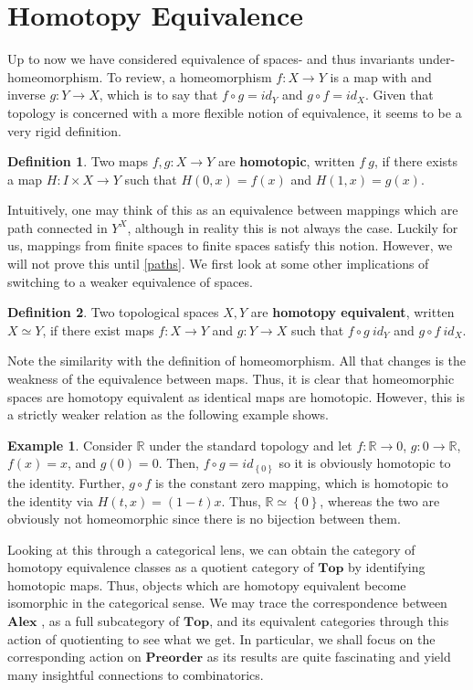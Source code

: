 \documentclass[paper=a4, fontsize=11pt]{scrartcl} %
\numberwithin{equation}{section} %
\numberwithin{figure}{section} %
\numberwithin{table}{section} %
\theoremstyle{definition}
\newtheorem{definition}{Definition}[section]
\newtheorem{example}{Example}[section]
\theoremstyle{remark}
\newcommand{\cat}[1]{\ensuremath{\mathbf{#1}} }
\newcommand{\Pre}{\cat{Preorder}}
\newcommand{\Al}{\cat{Alex}}
\newcommand{\comp}[2]{#1 \circ #2}
\newcommand{\Top}{\cat{Top}}
\newcommand{\homot}{\simeq}
\newcommand{\R}{\mathbb{R}}
\begin{document}
\section{Homotopy Equivalence}
Up to now we have considered equivalence of spaces- and thus invariants under- homeomorphism.
To review, a homeomorphism $f:X\rightarrow Y$ is a map with and inverse $g:Y\rightarrow X$, which is to say that $\comp{f}{g}=id_Y$ and $\comp{g}{f}=id_X$.
Given that topology is concerned with a more flexible notion of equivalence, it seems to be a very rigid definition. 
\begin{definition}
  Two maps $f,g:X\rightarrow Y$ are \textbf{homotopic}, written $f~g$, if there exists a map $H:I\times X\rightarrow Y$ such that $H(0,x)=f(x)$ and $H(1,x)=g(x)$.
\end{definition}
Intuitively, one may think of this as an equivalence between mappings which are path connected in $Y^X$, although in reality this is not always the case.
Luckily for us, mappings from finite spaces to finite spaces satisfy this notion.
However, we will not prove this until \ref{paths}.
We first look at some other implications of switching to a weaker equivalence of spaces.
\begin{definition}
  Two topological spaces $X,Y$ are \textbf{homotopy equivalent}, written $X\homot Y$, if there exist maps $f:X\rightarrow Y$ and $g:Y\rightarrow X$ such that $\comp{f}{g}~ id_Y$ and $\comp{g}{f}~ id_X$.
\end{definition}
Note the similarity with the definition of homeomorphism.
All that changes is the weakness of the equivalence between maps.
Thus, it is clear that homeomorphic spaces are homotopy equivalent as identical maps are homotopic.
However, this is a strictly weaker relation as the following example shows.
\begin{example}
  Consider $\R$ under the standard topology and let $f:\R \rightarrow {0}$, $g:{0}\rightarrow \R$, $f(x)=x$, and $g(0)=0$. 
  Then, $\comp{f}{g}=id_{\left\{ {0} \right\}}$ so it is obviously homotopic to the identity.
  Further, $\comp{g}{f}$ is the constant zero mapping, which is homotopic to the identity via $H(t,x)=(1-t)x$.
  Thus, $\R \homot \left\{ 0 \right\}$, whereas the two are obviously not homeomorphic since there is no bijection between them.
\end{example}

Looking at this through a categorical lens, we can obtain the category of homotopy equivalence classes as a quotient category of \Top by identifying homotopic maps.
Thus, objects which are homotopy equivalent become isomorphic in the categorical sense.
We may trace the correspondence between \Al, as a full subcategory of $\Top$, and its equivalent categories through this action of quotienting to see what we get.
In particular, we shall focus on the corresponding action on $\Pre$ as its results are quite fascinating and yield many insightful connections to combinatorics.
\end{document}
